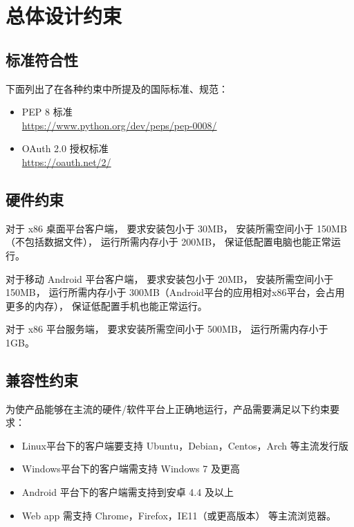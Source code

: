 \chapter{总体设计约束}

 
\section{标准符合性}
下面列出了在各种约束中所提及的国际标准、规范：
\begin{itemize}
    \item PEP 8 标准\\
    \url{https://www.python.org/dev/peps/pep-0008/}
    \item OAuth 2.0 授权标准\\
    \url{https://oauth.net/2/}
\end{itemize}

\section{硬件约束}


对于 x86 桌面平台客户端，
要求安装包小于 30MB，
安装所需空间小于 150MB（不包括数据文件），
运行所需内存小于 200MB，
保证低配置电脑也能正常运行。

对于移动 Android 平台客户端，
要求安装包小于 20MB，
安装所需空间小于 150MB，
运行所需内存小于 300MB（Android平台的应用相对x86平台，会占用更多的内存），
保证低配置手机也能正常运行。

对于 x86 平台服务端，
要求安装所需空间小于 500MB，
运行所需内存小于 1GB。

\section{兼容性约束}
为使产品能够在主流的硬件/软件平台上正确地运行，产品需要满足以下约束要求：
\begin{itemize}
    \item Linux平台下的客户端要支持 Ubuntu，Debian，Centos，Arch 等主流发行版
    \item Windows平台下的客户端需支持 Windows 7 及更高
    \item Android 平台下的客户端需支持到安卓 4.4 及以上
    \item Web app 需支持 Chrome，Firefox，IE11（或更高版本） 等主流浏览器。
    \end{itemize}

